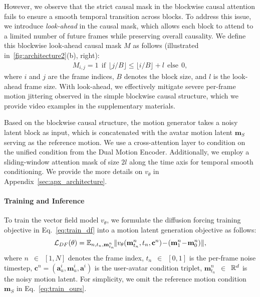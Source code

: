 However, we observe that the strict causal mask in the blockwise causal attention fails to ensure a smooth temporal transition across blocks.
To address this issue, we introduce \emph{look-ahead} in the causal mask, which allows each block to attend to a limited number of future frames while preserving overall causality.
We define this blockwise look-ahead causal mask $M$ as follows (illustrated in~\cref{fig:architecture2}(b), right):
\begin{align}
    M_{i,j} = 1 ~~\text{if}~~ \lfloor j / B \rfloor \leq \lfloor i / B \rfloor + l ~~\text{else}~~ 0, \label{eq:lookahead_mask}
\end{align}
where $i$ and $j$ are the frame indices, $B$ denotes the block size, and $l$ is the look-ahead frame size. With look-ahead, we effectively mitigate severe per-frame motion jittering observed in the simple blockwise causal structure, which we provide video examples in the supplementary materials.


Based on the blockwise causal structure, the motion generator takes a noisy latent block as input, which is concatenated with the avatar motion latent $\mathbf{m}_S$ serving as the reference motion.
We use a cross-attention layer to condition on the unified condition from the Dual Motion Encoder. 
Additionally, we employ a sliding-window attention mask of size $2l$ along the time axis for temporal smooth conditioning. We provide the more details on $v_{\theta}$ in Appendix~\ref{sec:apx_architecture}.



\paragraph{Training and Inference}
To train the vector field model $v_{\theta}$, we formulate the diffusion forcing training objective in Eq.~\eqref{eq:train_df} into a motion latent generation objective as follows:
\begin{equation}
	\mathcal{L}_{DF}(\theta) = \mathbb{E}_{n, t_n, \mathbf{m}^n_{t_n}}\! \| v_{\theta}(\mathbf{m}^n_{t_n}, t_n, \mathbf{c}^n) \!-\! (\mathbf{m}_1^n \!-\! \mathbf{m}_0^n)\|,
    \label{eq:train_ours}
\end{equation}
where $n$~$\in$~$[1,N]$ denotes the frame index, $t_n$~$\in$~$[0,1]$ is the per-frame noise timestep, $\mathbf{c}^n = (\mathbf{a}_u^{i}, \mathbf{m}_u^i, \mathbf{a}^i)$ is the user-avatar condition triplet, $\mathbf{m}_{t_n}^n$~$\in$~$\mathbb{R}^d$ is the noisy motion latent. For simplicity, we omit the reference motion condition $\mathbf{m}_S$ in Eq.~\eqref{eq:train_ours}.


